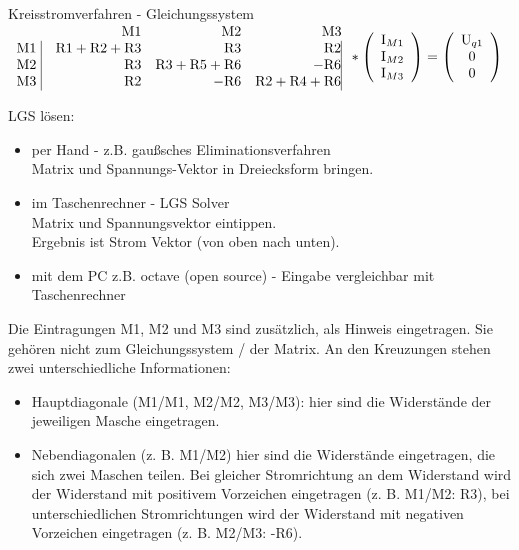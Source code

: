 \begin{frame}{Kreisstromverfahren - Gleichungssystem}
       $\begin{array}{crrrrrr}
        & \text{M1}& \text{M2}& \text{M3}\\
        \text{M1}\  \vline & \text{R}1+\text{R}2+\text{R}3 &     \text{R}3  & \text{R}2 \vline \\
        \text{M2} \ \vline & \text{R}3 & \text{R}3+\text{R}5+\text{R}6     & -\text{R}6 \vline \\
        \text{M3} \ \vline & \text{R}2  & -\text{R}6      &   \text{R}2+\text{R}4+\text{R}6 \vline
\end{array}%
*
\left(\begin{array}{c}
  \text{I}_{M1}\\
  \text{I}_{M2}\\
  \text{I}_{M3}
      \end{array} \right)
= \left( \begin{array}{c}
  \text{U}_{q1}\\
 0\\
 0\\
\end{array}\right)
$

LGS lösen:

\begin{itemize}
 \item per Hand - z.B. gaußsches Eliminationsverfahren\\ Matrix und Spannungs-Vektor in Dreiecksform bringen.
 \item im Taschenrechner - LGS Solver\\
 Matrix und Spannungsvektor eintippen.\\ Ergebnis ist Strom Vektor (von oben nach unten).
 \item mit dem PC z.B. octave (open source) - Eingabe vergleichbar mit Taschenrechner
\end{itemize}
\end{frame}%

Die Eintragungen M1, M2 und M3 sind zusätzlich, als Hinweis eingetragen. Sie gehören nicht zum Gleichungssystem / der Matrix.
An den Kreuzungen stehen zwei unterschiedliche Informationen:

\begin{itemize}
 \item Hauptdiagonale (M1/M1, M2/M2, M3/M3): hier sind die Widerstände der jeweiligen Masche eingetragen.
 \item Nebendiagonalen (z. B. M1/M2) hier sind die Widerstände eingetragen, die sich zwei Maschen teilen. Bei gleicher Stromrichtung an dem Widerstand wird der Widerstand mit positivem Vorzeichen eingetragen (z. B. M1/M2: R3), bei unterschiedlichen Stromrichtungen wird der Widerstand mit negativen Vorzeichen eingetragen (z. B. M2/M3: -R6).
\end{itemize}

